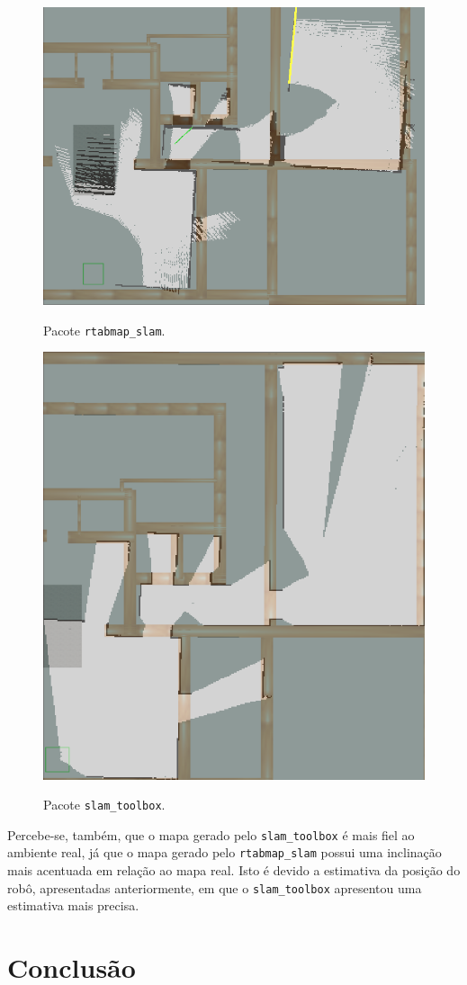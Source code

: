 \documentclass[repeatfields,xlists,xpacks,oneside,yearsonly]{ufrgscca}
\begin{document}
\begin{figure}[h]
    {
        \centering
        \caption{Pacote \texttt{rtabmap\_slam}.}
        \label{fig:mapping_rtabmap}
        \includegraphics[width=0.6\linewidth]{rtabmap_slam_map-compared.png}\\
    }
\end{figure}

\begin{figure}[h]
    {
        \centering
        \caption{Pacote \texttt{slam\_toolbox}.}
        \label{fig:mapping_slam_toolbox}
        \includegraphics[width=0.6\linewidth]{slam_toolbox_map-compared.png}\\
    }
\end{figure}

Percebe-se, também, que o mapa gerado pelo \texttt{slam\_toolbox} é
mais fiel ao ambiente real, já que o mapa gerado pelo
\texttt{rtabmap\_slam} possui uma inclinação mais acentuada em
relação ao mapa real. Isto é devido a estimativa da posição do robô,
apresentadas anteriormente, em que o \texttt{slam\_toolbox}
apresentou uma estimativa mais precisa.

\chapter{Conclusão}
\label{conclusao}

\printbibliography

%
%
%
\end{document}

